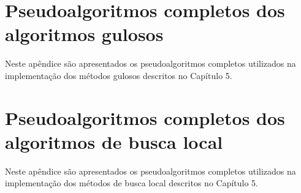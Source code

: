 \appendix

\chapter{Pseudoalgoritmos completos dos algoritmos gulosos}

Neste apêndice são apresentados os pseudoalgoritmos completos utilizados na implementação
dos métodos gulosos descritos no Capítulo 5.




\chapter{Pseudoalgoritmos completos dos algoritmos de busca local}

Neste apêndice são apresentados os pseudoalgoritmos completos utilizados na implementação
dos métodos de busca local descritos no Capítulo 5.


